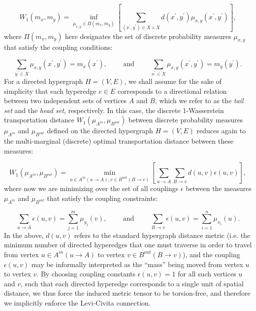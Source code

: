 \documentclass{article}
\begin{document}
\begin{equation}
W_1 \left( m_x, m_y \right) = \inf_{\mu_{x, y} \in \Pi \left( m_x, m_y \right)} \left[ \sum_{\left( x^{\prime}, y^{\prime} \right) \in X \times X} d \left( x^{\prime}, y^{\prime} \right) \mu_{x, y} \left( x^{\prime}, y^{\prime} \right) \right],
\end{equation}
where ${\Pi \left( m_x, m_y \right)}$ here designates the set of discrete probability measures ${\mu_{x, y}}$ that satisfy the coupling conditions:

\begin{equation}
\sum_{y^{\prime} \in X} \mu_{x, y} \left( x^{\prime}, y^{\prime} \right) = m_x \left( x^{\prime} \right), \qquad \text{ and } \qquad \sum_{x^{\prime} \in X} \mu_{x, y} \left( x^{\prime}, y^{\prime} \right) = m_y \left( y^{\prime} \right).
\end{equation}
For a directed hypergraph ${H = \left( V, E \right)}$, we shall assume for the sake of simplicity that each hyperedge ${e \in E}$ corresponds to a directional relation between two independent sets of vertices $A$ and $B$, which we refer to as the \textit{tail set} and the \textit{head set}, respectively. In this case, the discrete 1-Wasserstein transportation distance ${W_1 \left( \mu_{A^{in}}, \mu_{B^{out}} \right)}$ between discrete probability measures ${\mu_{A^{in}}}$ and ${\mu_{B^{out}}}$ defined on the directed hypergraph ${H = \left( V, E \right)}$ reduces again to the multi-marginal (discrete) optimal transportation distance between these measures:

\begin{equation}
W_1 \left( \mu_{A^{in}}, \mu_{B^{out}} \right) = \min_{u \in A^{in} \left( u \to A \right), v \in B^{out} \left( B \to v \right)} \left[ \sum_{u \to A} \sum_{B \to v} d \left( u, v \right) \epsilon \left( u, v \right) \right],
\end{equation}
where now we are minimizing over the set of all couplings ${\epsilon}$ between the measures ${\mu_{A^{in}}}$ and ${\mu_{B^{out}}}$ that satisfy the coupling constraints:

\begin{equation}
\sum_{u \to A} \epsilon \left( u, v \right) = \sum_{j = 1}^{m} \mu_{y_j} \left( v \right), \qquad \text{ and } \qquad \sum_{B \to v} \epsilon \left( u, v \right) = \sum_{i = 1}^{n} \mu_{x_i} \left( u \right).
\end{equation}
In the above, ${d \left( u, v \right)}$ refers to the standard hypergraph distance metric (i.e. the minimum number of directed hyperedges that one must traverse in order to travel from vertex ${u \in A^{in} \left( u \to A \right)}$ to vertex ${v \in B^{out} \left( B \to v \right)}$), and the coupling ${\epsilon \left( u, v \right)}$ may be informally interpreted as the ``mass'' being moved from vertex $u$ to vertex $v$. By choosing coupling constants ${\epsilon \left( u, v \right) = 1}$ for all such vertices $u$ and $v$, such that each directed hyperedge corresponds to a single unit of spatial distance, we thus force the induced metric tensor to be torsion-free, and therefore we implicitly enforce the Levi-Civita connection.
\end{document}
